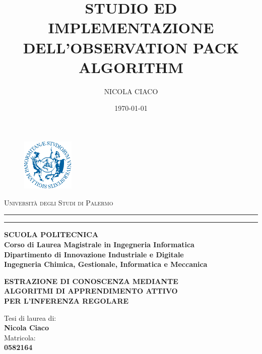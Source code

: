 \documentclass[12pt, oneside]{book}
\theoremstyle{definition}
\theoremstyle{plain}
\begin{document}
\pagestyle{empty}
\title{STUDIO ED IMPLEMENTAZIONE DELL'OBSERVATION PACK ALGORITHM}
\author{NICOLA CIACO}
\date{\today}

\begin{titlepage}
\begin{center}
\begin{figure}[!h]
  	\centering
 	\includegraphics[width=2.5cm]{./pictures/frontespizio/logo_unipa.png}
\end{figure}
{{\Large{\textsc{Università degli Studi di Palermo}}}} \\
\rule[0.1cm]{15.8cm}{0.1mm}
\rule[0.5cm]{15.8cm}{0.6mm}
{\small{\bf SCUOLA POLITECNICA\\
Corso di Laurea Magistrale in Ingegneria Informatica\\
Dipartimento di Innovazione Industriale e Digitale \\Ingegneria Chimica, Gestionale, Informatica e Meccanica}}\\
\vspace{10mm}
\end{center}
\vspace{8mm}
\begin{center}
{\Large{\bf ESTRAZIONE DI CONOSCENZA MEDIANTE}}\\
\vspace{3mm}
{\Large{\bf  ALGORITMI DI APPRENDIMENTO ATTIVO }}\\
 \vspace{3mm}
 {\Large{\bf PER L'INFERENZA REGOLARE}}\\
\end{center}
\vspace{17mm}
\par
\noindent
\begin{minipage}[t]{0.70\textwidth}\raggedright
{\large Tesi di laurea di:\\
\vspace{3mm}
\textbf {Nicola Ciaco}\\
\vspace{10mm}
Matricola:\\
\vspace{3mm}
\textbf {0582164}\\

}
\end{minipage}
\end{titlepage}
\end{document}

